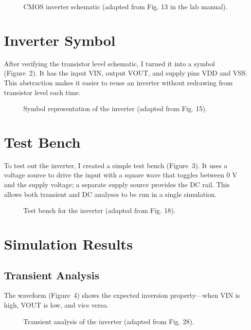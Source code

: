 \documentclass[11pt]{article}
\begin{document}
\begin{figure}[h!]
    \centering
    \fbox{\rule{0.6\textwidth}{2in}}
    \caption{CMOS inverter schematic (adapted from Fig. 13 in the lab manual).}
\end{figure}

\section*{Inverter Symbol}
After verifying the transistor level schematic, I turned it into a symbol (Figure~2). It has the input VIN, output VOUT, and supply pins VDD and VSS. This abstraction makes it easier to reuse an inverter without redrawing from transistor level each time.

\begin{figure}[h!]
    \centering
    \fbox{\rule{0.5\textwidth}{2in}}
    \caption{Symbol representation of the inverter (adapted from Fig. 15).}
\end{figure}

\section*{Test Bench}
To test out the inverter, I created a simple test bench (Figure~3). It uses a voltage source to drive the input with a square wave that toggles between 0 V and the supply voltage; a separate supply source provides the DC rail. This allows both transient and DC analyses to be run in a single simulation.

\begin{figure}[h!]
    \centering
    \fbox{\rule{0.6\textwidth}{2in}}
    \caption{Test bench for the inverter (adapted from Fig. 18).}
\end{figure}

\section*{Simulation Results}
\subsection*{Transient Analysis}
The waveform (Figure~4) shows the expected inversion property---when VIN is high, VOUT is low, and vice versa.

\begin{figure}[h!]
    \centering
    \fbox{\rule{0.6\textwidth}{2in}}
    \caption{Transient analysis of the inverter (adapted from Fig. 28).}
\end{figure}
\end{document}
